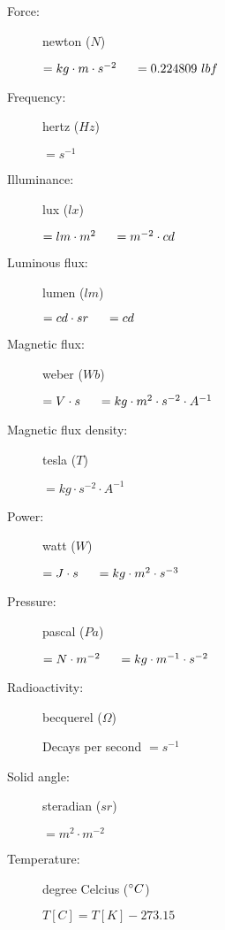 \begin{description}
\item[Force:] newton ($N$)
\begin{itemize}
\items $= kg \cdot m \cdot s^{-2} \tab[0.5cm] = 0.224809\ lbf$
\end{itemize}	

\item[Frequency:] hertz ($Hz$)
\begin{itemize}
\items $=s^{-1}$
\end{itemize}				

\item[Illuminance:] lux ($lx$)
\begin{itemize}
\items $= lm\cdot m^{2} \tab[0.5cm]= m^{-2} \cdot cd$
\end{itemize}							

\item[Luminous flux:] lumen ($lm$)
\begin{itemize}
\items $= cd \cdot sr \tab[0.5cm]= cd$
\end{itemize}				

\item[Magnetic flux:] weber ($Wb$)
\begin{itemize}
\items $= V \cdot s \tab[0.5cm]= kg \cdot m^2 \cdot s^{-2} \cdot A^{-1}$
\end{itemize}				

\item[Magnetic flux density:] tesla ($T$)
\begin{itemize}
\items $= kg \cdot s^{-2} \cdot A^{-1}$
\end{itemize}				

\item[Power:] watt ($W$)
\begin{itemize}
\items $= J \cdot s \tab[0.5cm]= kg \cdot m^2 \cdot s^{-3}$
\end{itemize}

\item[Pressure:] pascal ($Pa$)
\begin{itemize}
\items $= N\cdot m^{-2} \tab[0.5cm]= kg \cdot m^{-1} \cdot s^{-2}$
\end{itemize}

\item[Radioactivity:] becquerel ($\Omega$)
\begin{itemize}
\items Decays per second
\items $= s^{-1}$
\end{itemize}
                
\item[Solid angle:] steradian ($sr$)
\begin{itemize}
\items $ = m^2\cdot m^{-2}$
\end{itemize}

\item[Temperature:] degree Celcius ($\degrees C$)
\begin{itemize}
\items $T [C] = T [K] - 273.15$
\end{itemize}					
\end{description}			
						
